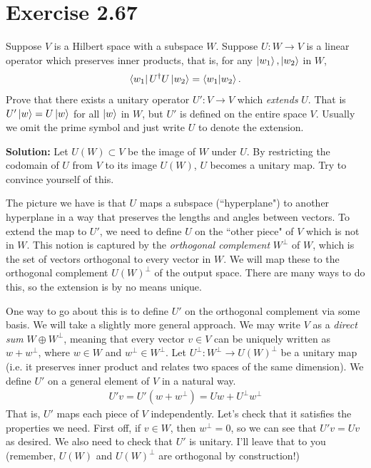 \documentclass{book}
\begin{document}
\section*{Exercise 2.67}
    Suppose $V$ is a Hilbert space with a subspace $W$. Suppose $U: W \to V$ is a linear operator which preserves inner products, that is, for any $\ket{w_1}, \ket{w_2}$ in $W$,
    \begin{align}
        \bra{w_1}U^\dagger U \ket{w_2} = \braket{w_1}{w_2}.
    \end{align}
    Prove that there exists a unitary operator $U': V\to V$ which \emph{extends} $U$. That is $U'\ket{w} = U\ket{w}$ for all $\ket{w}$ in $W$, but $U'$ is defined on the entire space $V$. Usually we omit the prime symbol and just write $U$ to denote the extension.

    \textbf{Solution:} Let $U(W) \subset V$ be the image of $W$ under $U$. By restricting the codomain of $U$ from $V$ to its image $U(W)$, $U$ becomes a unitary map. Try to convince yourself of this. 

    The picture we have is that $U$ maps a subspace (``hyperplane") to another hyperplane in a way that preserves the lengths and angles between vectors. To extend the map to $U'$, we need to define $U$ on the ``other piece" of $V$ which is not in $W$. This notion is captured by the \emph{orthogonal complement} $W^\perp$ of $W$, which is the set of vectors orthogonal to every vector in $W$. We will map these to the orthogonal complement $U(W)^\perp$ of the output space. There are many ways to do this, so the extension is by no means unique.

    One way to go about this is to define $U'$ on the orthogonal complement via some basis. We will take a slightly more general approach. We may write $V$ as a \emph{direct sum} $W\oplus W^\perp$, meaning that every vector $v \in V$ can be uniquely written as $w + w^\perp$, where $w\in W$ and $w^\perp \in W^\perp$. Let $U^\perp: W^\perp \to U(W)^\perp$ be a unitary map (i.e. it preserves inner product and relates two spaces of the same dimension). We define $U'$ on a general element of $V$ in a natural way.
    \begin{align}
        U'v = U'(w + w^\perp) = Uw + U^\perp w^\perp
    \end{align}
    That is, $U'$ maps each piece of $V$ independently. Let's check that it satisfies the properties we need. First off, if $v \in W$, then $w^\perp = 0$, so we can see that $U' v  = U v$ as desired. We also need to check that $U'$ is unitary. I'll leave that to you (remember, $U(W)$ and $U(W)^\perp$ are orthogonal by construction!)
\end{document}
